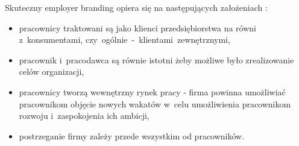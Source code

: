 Skuteczny employer branding opiera się na następujących założeniach \cite{spychala-2019}:
\begin{itemize}
    \item pracownicy traktowani są jako klienci przedsiębiorstwa na równi z~konsumentami, czy~ogólnie~-~klientami~zewnętrznymi,
    \item pracownik i~pracodawca są równie istotni żeby możliwe było zrealizowanie celów organizacji,
    \item pracownicy tworzą wewnętrzny rynek pracy - firma powinna umożliwiać pracownikom objęcie nowych wakatów w~celu umożliwienia pracownikom rozwoju i~zaspokojenia ich ambicji,
    \item postrzeganie firmy zależy przede wszystkim od pracowników.
\end{itemize}

